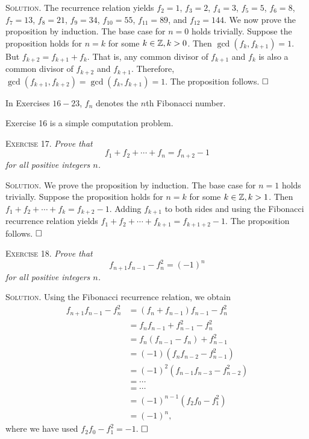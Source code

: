 \documentclass[11pt, leqno]{article}
\newcommand{\done}{\ensuremath{\hfill\square}}
\begin{document}
\textsc{Solution}. The recurrence relation yields $f_2=1$, $f_3=2$, $f_4=3$, $f_5 = 5$, $f_6 = 8$, $f_7 = 13$, $f_8 = 21$, $f_9 = 34$, $f_{10} = 55$, $f_{11} = 89$, and $f_{12} = 144$. We now prove the proposition by induction. The base case for $n=0$ holds trivially. Suppose the proposition holds for $n=k$ for some $k\in\mathbb{Z}, k>0$. Then $\gcd(f_k, f_{k+1}) = 1$. But $f_{k+2} = f_{k+1} + f_k$. That is, any common divisor of $f_{k+1}$ and $f_k$ is also a common divisor of $f_{k+2}$ and $f_{k+1}$. Therefore, $\gcd(f_{k+1}, f_{k+2}) = \gcd(f_k, f_{k+1}) = 1$. The proposition follows. \done

In Exercises $16-23$, $f_n$ denotes the $n$th Fibonacci number.

Exercise 16 is a simple computation problem.

\textsc{Exercise 17}. \emph{Prove that 
\begin{displaymath}
f_1 + f_2 + \cdots + f_n = f_{n+2} - 1
\end{displaymath}
for all positive integers $n$.}

\textsc{Solution}. We prove the proposition by induction. The base case for $n=1$ holds trivially. Suppose the proposition holds for $n=k$ for some $k\in\mathbb{Z}, k>1$. Then $f_1 + f_2 + \cdots + f_k = f_{k+2} - 1$. Adding $f_{k+1}$ to both sides and using the Fibonacci recurrence relation yields $f_1 + f_2 + \cdots + f_{k+1} = f_{k+1+2} - 1$. The proposition follows. \done

\textsc{Exercise 18}. \emph{Prove that 
\begin{displaymath}
f_{n+1}f_{n-1} - f_n^2 = (-1)^n
\end{displaymath}
for all positive integers $n$.}

\textsc{Solution}. Using the Fibonacci recurrence relation, we obtain 
\begin{align*}
  f_{n+1}f_{n-1} - f_n^2 &= (f_n+f_{n-1})f_{n-1} - f_n^2 \\
                         &= f_nf_{n-1} + f_{n-1}^2 - f_n^2 \\
                         &= f_n(f_{n-1} - f_n) + f_{n-1}^2 \\
                         &= (-1)(f_nf_{n-2} - f_{n-1}^2) \\
                         &= (-1)^2(f_{n-1}f_{n-3} - f_{n-2}^2) \\
                         &= \cdots \\
                         &= \cdots \\
                         &= (-1)^{n-1}(f_2f_0 - f_1^2) \\
  &= (-1)^n,
\end{align*}
where we have used $f_2f_0-f_1^2 = -1$. \done
\end{document}
